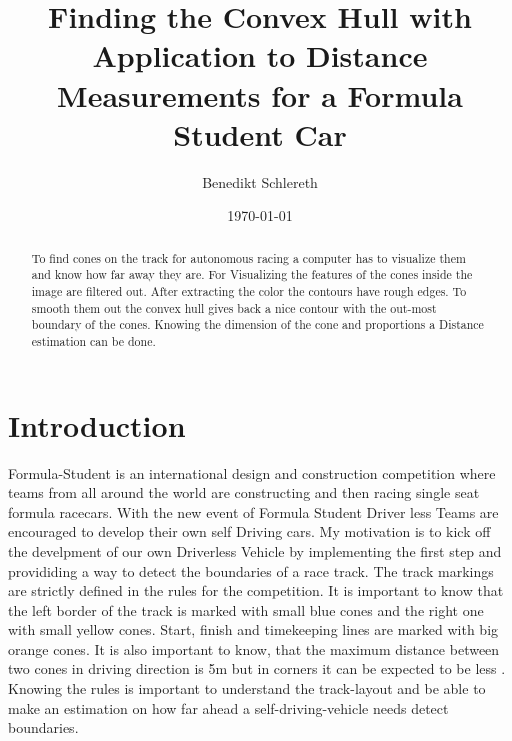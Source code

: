 \documentclass[10pt,a4paper]{article}
\title{Finding the Convex Hull with Application to Distance Measurements for a Formula Student Car}
\author{Benedikt Schlereth}
\date{\today}
\begin{document}
	\maketitle
	\tableofcontents
	\pagebreak
	
	\begin{abstract}
	To find cones on the track for autonomous racing a computer has to visualize them and know how far away they are.
	For Visualizing the features of the cones inside the image are filtered out. After extracting the color the contours have rough edges. To smooth them out the convex hull gives back a nice contour with the out-most boundary of the cones. Knowing the dimension of the cone and proportions a Distance estimation can be done.
	\end{abstract}
	
	\section{Introduction}
	Formula-Student is an international design and construction competition where teams from all around the world are constructing and then racing single seat formula racecars. With	the new event of Formula Student Driver less Teams are encouraged to develop their own self Driving cars.
	My motivation is to kick off the develpment of our own Driverless Vehicle by implementing the first step and provididing a way to detect the boundaries of a race track.
	The track markings are strictly defined in the rules for the competition. It is important to know that the left border of the track is marked with small blue cones and the right one with small yellow cones. 
	Start, finish and timekeeping lines are marked with big orange cones. It is also important to know, that the maximum distance between two cones in driving direction is 5m but in corners it can be expected to be less \cite{handbook}. Knowing the rules is important to understand the track-layout and be able to make an estimation on how far ahead a self-driving-vehicle needs detect boundaries. 
	
\end{document}
